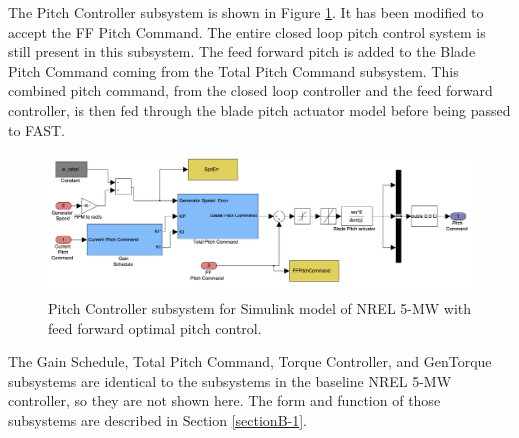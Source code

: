 The Pitch Controller subsystem is shown in Figure \ref{figB-9}. It has been modified to accept the FF Pitch Command. The entire closed loop pitch control system is still present in this subsystem. The feed forward pitch is added to the Blade Pitch Command coming from the Total Pitch Command subsystem. This combined pitch command, from the closed loop controller and the feed forward controller, is then fed through the blade pitch actuator model before being passed to FAST.

\begin{figure}[ht]
	\centering
		\includegraphics[width=\linewidth]{Figures/AppendixBFigures/FF_Pitch3.png}
	\caption{Pitch Controller subsystem for Simulink model of NREL 5-MW with feed forward optimal pitch control.}
	\label{figB-9}
\end{figure}

The Gain Schedule, Total Pitch Command, Torque Controller, and GenTorque subsystems are identical to the subsystems in the baseline NREL 5-MW controller, so they are not shown here. The form and function of those subsystems are described in Section \ref{sectionB-1}.
